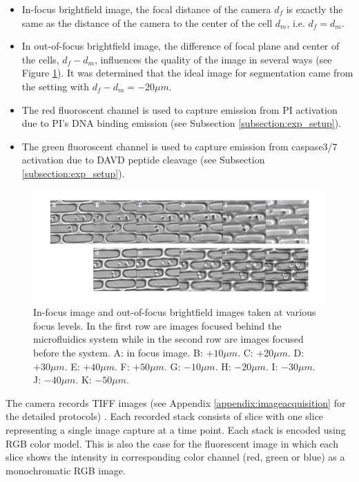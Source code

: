 \documentclass[pdftex,12pt,a4paper]{report}
\begin{document}
\begin{itemize}
\item In-focus brightfield image, the focal distance of the camera $d_f$ is exactly the same as the distance of the camera to the center of the cell $d_m$, i.e. $d_f = d_m$.

\item In out-of-focus brightfield image, the difference of focal plane and center of the cells, $d_f - d_m$, influences the quality of the image in several ways (see Figure \ref{fig:focustest}). It was determined that the ideal image for segmentation came from the setting with $d_f - d_m = -20 \mu m$.

\item The red fluoroscent channel is used to capture emission from PI activation due to PI's DNA binding emission (see Subsection \ref{subsection:exp_setup}).

\item The green fluoroscent channel is used to capture emission from caspase3/7 activation due to DAVD peptide cleavage (see Subsection \ref{subsection:exp_setup}).
\end{itemize}


\begin{figure}[H]
\centering
\includegraphics[width=\textwidth]{images/focus/pict.png}
\caption[Effect on focal plane on out-of-focus image]{In-focus image and out-of-focus brightfield images taken at various focus levels.  In the first row are images focused behind the microfluidics system while in the second row are images focused before the system. A: in focus image. B: $+10 \mu m$. C: $+20 \mu m$. D: $+30 \mu m$. E: $+40 \mu m$. F: $+50 \mu m$. G: $-10 \mu m$. H: $-20 \mu m$. I: $-30 \mu m$. J: $-40 \mu m$. K: $-50 \mu m$.}
\label{fig:focustest}
\end{figure}

The camera records TIFF images (see Appendix \ref{appendix:imageacquisition} for the detailed protocols) \cite{loc2006tiff}. Each recorded stack consists of slice with one slice representing a single image capture at a time point. Each stack is encoded using RGB color model. This is also the case for the fluorescent image in which each slice shows the intensity in corresponding color channel (red, green or blue) as a monochromatic RGB image.
\end{document}

